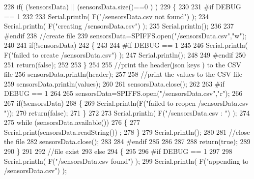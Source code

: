 \begin{DoxyCode}
228     \textcolor{keywordflow}{if}( (!sensorsData) || (sensorsData.size()==0 ) )
229     \{
230     
231 \textcolor{preprocessor}{    #if DEBUG == 1}
232     
233         Serial.println( F(\textcolor{stringliteral}{"/sensorsData.csv not found"}) );
234         Serial.println( F(\textcolor{stringliteral}{"creating /sensorsData.csv"}) );
235         Serial.println();
236     
237 \textcolor{preprocessor}{    #endif}
238         \textcolor{comment}{//create file}
239         sensorsData=SPIFFS.open(\textcolor{stringliteral}{"/sensorsData.csv"},\textcolor{stringliteral}{"w"});
240         
241         \textcolor{keywordflow}{if}(!sensorsData)
242         \{
243 
244 \textcolor{preprocessor}{        #if DEBUG == 1}
245         
246             Serial.println( F(\textcolor{stringliteral}{"failed to create /sensorsData.csv"}) );
247             Serial.println();
248         
249 \textcolor{preprocessor}{        #endif}
250         
251             \textcolor{keywordflow}{return}(\textcolor{keyword}{false});
252 
253         \}
254         
255         \textcolor{comment}{//print the header(json keys ) to the CSV file}
256         sensorsData.println(header);
257 
258         \textcolor{comment}{//print the values to the CSV file}
259         sensorsData.println(values);
260         
261         sensorsData.close();
262     
263 \textcolor{preprocessor}{    #if DEBUG == 1}
264 
265         sensorsData=SPIFFS.open(\textcolor{stringliteral}{"/sensorsData.csv"},\textcolor{stringliteral}{"r"});
266         
267         \textcolor{keywordflow}{if}(!sensorsData)
268         \{
269             Serial.println(F(\textcolor{stringliteral}{"failed to reopen /sensorsData.csv "}));
270             \textcolor{keywordflow}{return}(\textcolor{keyword}{false});      
271         \}
272 
273         Serial.println( F(\textcolor{stringliteral}{"/sensorsData.csv : "}) );
274 
275         \textcolor{keywordflow}{while} (sensorsData.available()) 
276         \{
277             Serial.print(sensorsData.readString()) ;
278         \}
279         Serial.println();
280 
281         \textcolor{comment}{//close the file}
282         sensorsData.close();
283 
284 \textcolor{preprocessor}{    #endif}
285         
286 
287         
288         \textcolor{keywordflow}{return}(\textcolor{keyword}{true});
289         
290     \}
291 
292     \textcolor{comment}{//file exist}
293     \textcolor{keywordflow}{else}
294     \{
295 
296 \textcolor{preprocessor}{    #if DEBUG == 1}
297     
298         Serial.println( F(\textcolor{stringliteral}{"/sensorsData.csv  found"}) );
299         Serial.println( F(\textcolor{stringliteral}{"appending to /sensorsData.csv"}) );

\end{DoxyCode}
